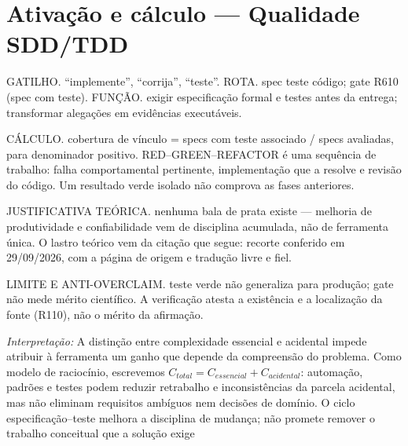 \section[Ativação e cálculo]{Ativação e cálculo — Qualidade SDD/TDD}

\begin{processo}
GATILHO. ``implemente'', ``corrija'', ``teste''.
ROTA. spec \textrightarrow{} teste \textrightarrow{} código; gate R610 (spec com teste).
FUNÇÃO. exigir especificação formal e testes antes da entrega; transformar alegações em evidências executáveis.
\end{processo}

\begin{resultado}
CÁLCULO. cobertura de vínculo = specs com teste associado / specs avaliadas,
para denominador positivo. RED--GREEN--REFACTOR é uma sequência de trabalho:
falha comportamental pertinente, implementação que a resolve e revisão do
código. Um resultado verde isolado não comprova as fases anteriores.
\end{resultado}

\begin{descricao}
JUSTIFICATIVA TEÓRICA. nenhuma bala de prata existe — melhoria de produtividade e confiabilidade vem de disciplina acumulada, não de ferramenta única. O lastro teórico vem da citação que segue: recorte conferido em 29/09/2026, com a página de origem e tradução livre e fiel.
\end{descricao}

\begin{aviso}
LIMITE E ANTI-OVERCLAIM. teste verde não generaliza para produção; gate não mede mérito científico. A verificação atesta a existência e a
localização da fonte (R110), não o mérito da afirmação.
\end{aviso}

\noindent\textit{Interpretação:} A distinção entre complexidade essencial e acidental impede atribuir à ferramenta um ganho que depende da compreensão do problema. Como modelo de raciocínio, escrevemos $C_{total}=C_{essencial}+C_{acidental}$: automação, padrões e testes podem reduzir retrabalho e inconsistências da parcela acidental, mas não eliminam requisitos ambíguos nem decisões de domínio. O ciclo especificação--teste melhora a disciplina de mudança; não promete remover o trabalho conceitual que a solução exige 

